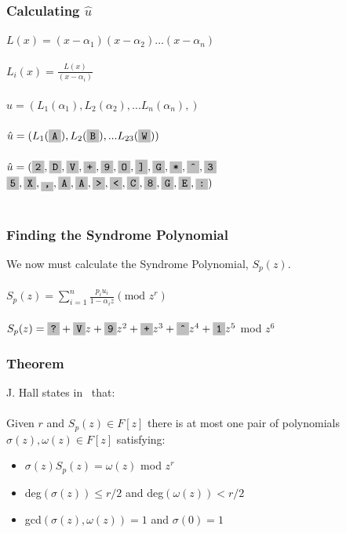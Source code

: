 \documentclass{beamer}
\begin{document}
\begin{frame}
	\frametitle{Calculating $\hat{u}$}
	$L(x) = (x - \alpha_{1})(x - \alpha_{2})...(x - \alpha_{n})$\\~\\
	$L_{i}(x) = \frac{L(x)}{(x - \alpha_{i})}$\\~\\
    $\hat{u} = (L_{1}(\alpha_{1}), L_{2}(\alpha_{2}), ... L_{n}(\alpha_{n}),) $\\~\\
	$\hat{u} = (L_{1}(\f{A}), L_{2}(\f{B}), ... L_{23}(\f{W})) $\\~\\
	$\hat{u} = (\f{2}, \f{D}, \f{V}, \f{+}, \f{9}, \f{O}, \f{]}, \f{G}, \f{*}, \f{\^}, \f{3}$
    \hspace*{4.5ex}	    $\f{5}, \f{X}, \f{,}, \f{A}, \f{A}, \f{>}, \f{<}, \f{C}, \f{8}, \f{G}, \f{E}, \f{:}) $\\~\\
\end{frame}

\begin{frame}
	\frametitle{Finding the Syndrome Polynomial}
    We now must calculate the Syndrome Polynomial, $S_{p}(z)$.\\~\\
    
	$S_{p}(z) = \sum\limits^{n}_{i=1} \frac{p_{i}u_{i}}{1-\alpha_{i}z} (\text{mod } z^{r})$\\~\\
    
    $S_{p}(z) = \f{?} + \f{V}z + \f{9}z^{2} + \f{+}z^3 + \f{\^}z^{4} + \f{1}z^{5}$ mod $z^{6}$

\end{frame}

\begin{frame}
	\frametitle{Theorem}
    J. Hall states in~\cite{Hall:2012} that:\\~\\
    Given $r$ and $S_{p}(z) \in F[z]$ there is at most one pair of polynomials $\sigma(z),\omega(z) \in F[z]$ satisfying:
    
    \begin{itemize}
		\item $\sigma(z)S_{p}(z) = \omega(z)$ mod $z^{r}$
        \item deg$(\sigma(z)) \leq r/2$ and deg$(\omega(z)) < r/2$
        \item gcd$(\sigma(z),\omega(z)) = 1$ and $\sigma(0) = 1$
    \end{itemize}

\end{frame}
\end{document}
